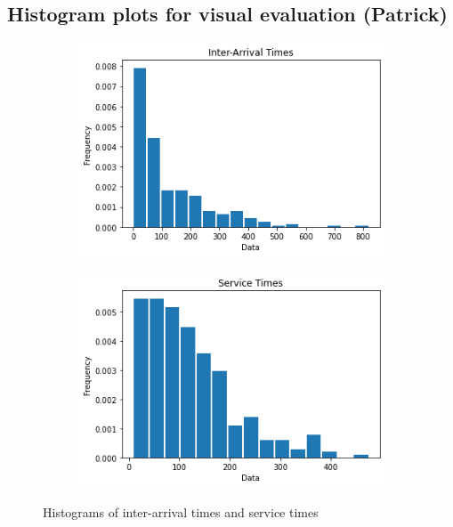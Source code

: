 \documentclass{article}
\begin{document}
\subsection{Histogram plots for visual evaluation (Patrick)}

\begin{figure}[h]
    \centering
    \begin{subfigure}[b]{0.45\textwidth}
        \centering
        \includegraphics[width=\textwidth]{fig1.png}
        \caption{}
        \label{fig:img1}
    \end{subfigure}
    \hfill
    \begin{subfigure}[b]{0.45\textwidth}
        \centering
        \includegraphics[width=\textwidth]{fig2.png}
        \caption{}
        \label{fig:img2}
    \end{subfigure}

    \caption{Histograms of inter-arrival times and service times}
    \label{fig:two-figs}
\end{figure}
\end{document}
